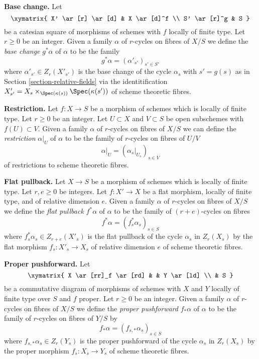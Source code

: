 \medskip\noindent
{\bf Base change.} Let
$$
\xymatrix{
X' \ar[r] \ar[d] & X \ar[d]^f \\
S' \ar[r]^g & S
}
$$
be a catesian square of morphisms of schemes with $f$ locally of finite type.
Let $r \geq 0$ be an integer. Given a family $\alpha$ of $r$-cycles on
fibres of $X/S$ we define the {\it base change} $g^*\alpha$ of $\alpha$
to be the family
$$
g^*\alpha = (\alpha'_{s'})_{s' \in S'}
$$
where $\alpha'_{s'} \in Z_r(X'_{s'})$ is the base change
of the cycle $\alpha_s$ with $s' = g(s)$ as in
Section \ref{section-relative-fields} via the identitification
$X'_{s'} = X_s \times_{\Spec(\kappa(s))} \Spec(\kappa(s'))$
of scheme theoretic fibres.

\medskip\noindent
{\bf Restriction.} Let $f : X \to S$ be a morphism of schemes which is locally
of finite type. Let $r \geq 0$ be an integer. Let $U \subset X$ and
$V \subset S$ be open subschemes with $f(U) \subset V$. Given a family
$\alpha$ of $r$-cycles on fibres of $X/S$ we can define the
{\it restriction} $\alpha|_U$ of $\alpha$ to be the
family of $r$-cycles on fibres of $U/V$
$$
\alpha|_U = (\alpha_s|_{U_s})_{s \in V}
$$
of restrictions to scheme theoretic fibres.

\medskip\noindent
{\bf Flat pullback.} Let $X \to S$ be a morphism of schemes which is locally
of finite type. Let $r, e \geq 0$ be integers. Let $f : X' \to X$ be a
flat morphism, locally of finite type, and of relative dimension $e$.
Given a family $\alpha$ of $r$-cycles
on fibres of $X/S$ we define the {\it flat pullback} $f^*\alpha$ of $\alpha$
to be the family of $(r + e)$-cycles on fibres
$$
f^*\alpha = (f_s^*\alpha_s)_{s \in S}
$$
where $f_s^*\alpha_s \in Z_{r + e}(X'_s)$ is the flat pullback
of the cycle $\alpha_s$ in $Z_r(X_s)$ by the flat morphism
$f_s : X'_s \to X_s$ of relative dimension $e$
of scheme theoretic fibres.

\medskip\noindent
{\bf Proper pushforward.} Let
$$
\xymatrix{
X \ar[rr]_f \ar[rd] & & Y \ar[ld] \\
& S
}
$$
be a commutative diagram of morphisms of schemes with $X$ and $Y$
locally of finite type over $S$ and $f$ proper. Let $r \geq 0$ be an integer.
Given a family $\alpha$ of $r$-cycles on fibres of $X/S$ we define the
{\it proper pushforward} $f_*\alpha$ of $\alpha$ to be the family of
$r$-cycles on fibres of $Y/S$ by
$$
f_*\alpha = (f_{s, *}\alpha_s)_{s \in S}
$$
where $f_{s, *}\alpha_s \in Z_r(Y_s)$ is the proper pushforward
of the cycle $\alpha_s$ in $Z_r(X_s)$ by the proper morphism
$f_s : X_s \to Y_s$ of scheme theoretic fibres.

